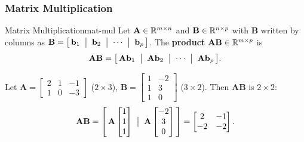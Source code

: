 \subsubsection{Matrix Multiplication}

\begin{definition}{Matrix Multiplication}{mat-mul}
  Let $\mathbf{A} \in \mathbb{R}^{m \times n}$ and $\mathbf{B} \in \mathbb{R}^{n \times p}$ with $\mathbf{B}$ written by columns as $\mathbf{B} = \bigl[\,\mathbf{b}_1 \;\bigm|\; \mathbf{b}_2 \;\bigm|\; \cdots \;\bigm|\; \mathbf{b}_p\,\bigr]$. The \textbf{product} $\mathbf{A}\mathbf{B} \in \mathbb{R}^{m \times p}$ is
  \[
    \mathbf{A}\mathbf{B}
    = \bigl[\,\mathbf{A}\mathbf{b}_1 \;\bigm|\; \mathbf{A}\mathbf{b}_2 \;\bigm|\; \cdots \;\bigm|\; \mathbf{A}\mathbf{b}_p\,\bigr].
  \]
\end{definition}

\begin{example}
  Let
  $\mathbf{A} =
    \begin{bmatrix}
      2 & 1 & -1 \\ 1 & 0 & -3
    \end{bmatrix}
  $ ($2 \times 3$),
  $\mathbf{B} =
    \begin{bmatrix}
      1 & -2 \\ 1 & 3 \\ 1 & 0
    \end{bmatrix}
  $ ($3 \times 2$).
  Then $\mathbf{A}\mathbf{B}$ is $2 \times 2$:
  \[
    \mathbf{A}\mathbf{B}
    = \left[\,\mathbf{A}
      \begin{bmatrix}
        1 \\ 1 \\ 1
      \end{bmatrix}
      \;\bigm|\; \mathbf{A}
      \begin{bmatrix}
        -2 \\ 3 \\ 0
      \end{bmatrix}
      \,\right]
    =
    \begin{bmatrix}
      2 & -1 \\ -2 & -2
    \end{bmatrix}
    .
  \]
\end{example}

